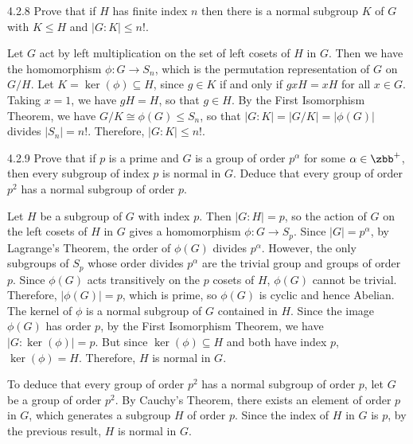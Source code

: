 \begin{exercise}{4.2.8}
	Prove that if $H$ has finite index $n$ then there is a normal subgroup $K$ of $G$ with $K \le H$ and $|G : K| \le n!$.
\end{exercise}

\begin{sol}
	Let $G$ act by left multiplication on the set of left cosets of $H$ in $G$.
	Then we have the homomorphism $\phi : G \to S_n$, which is the permutation representation of $G$ on $G/H$.
	Let $K = \ker(\phi) \subseteq H$, since $g \in K$ if and only if $gxH = xH$ for all $x \in G$.
	Taking $x = 1$, we have $gH = H$, so that $g \in H$.
	By the First Isomorphism Theorem, we have $G/K \cong \phi(G) \leq S_n$, so that $|G : K| = |G/K| = |\phi(G)|$ divides $|S_n| = n!$.
	Therefore, $|G : K| \leq n!$.
\end{sol}

\begin{exercise}{4.2.9}
	Prove that if $p$ is a prime and $G$ is a group of order $p^\alpha$ for some $\alpha \in \zbb^+$, then every subgroup of index $p$ is normal in $G$.
	Deduce that every group of order $p^2$ has a normal subgroup of order $p$.
\end{exercise}

\begin{sol}
	Let $H$ be a subgroup of $G$ with index $p$.
	Then $|G : H| = p$, so the action of $G$ on the left cosets of $H$ in $G$ gives a homomorphism $\phi : G \to S_p$.
	Since $|G| = p^\alpha$, by Lagrange's Theorem, the order of $\phi(G)$ divides $p^\alpha$.
	However, the only subgroups of $S_p$ whose order divides $p^\alpha$ are the trivial group and groups of order $p$.
	Since $\phi(G)$ acts transitively on the $p$ cosets of $H$, $\phi(G)$ cannot be trivial.
	Therefore, $|\phi(G)| = p$, which is prime, so $\phi(G)$ is cyclic and hence Abelian.
	The kernel of $\phi$ is a normal subgroup of $G$ contained in $H$.
	Since the image $\phi(G)$ has order $p$, by the First Isomorphism Theorem, we have $|G : \ker(\phi)| = p$.
	But since $\ker(\phi) \subseteq H$ and both have index $p$, $\ker(\phi) = H$.
	Therefore, $H$ is normal in $G$.

	To deduce that every group of order $p^2$ has a normal subgroup of order $p$, let $G$ be a group of order $p^2$.
	By Cauchy's Theorem, there exists an element of order $p$ in $G$, which generates a subgroup $H$ of order $p$.
	Since the index of $H$ in $G$ is $p$, by the previous result, $H$ is normal in $G$.
\end{sol}

